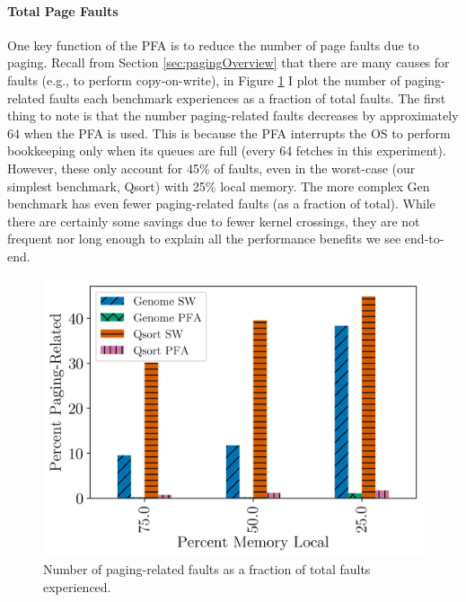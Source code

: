   \paragraph{Total Page Faults}
  One key function of the PFA is to reduce the number of page faults due to
  paging. Recall from Section \ref{sec:pagingOverview} that there are many
  causes for faults (e.g., to perform copy-on-write), in Figure
  \ref{fig:pfa_swapfault} I plot the number of paging-related faults each
  benchmark experiences as a fraction of total faults. The first thing to note
  is that the number paging-related faults decreases by approximately 64 when
  the PFA is used. This is because the PFA interrupts the OS to perform
  bookkeeping only when its queues are full (every 64 fetches in this
  experiment). However, these only account for 45\% of faults, even in the
  worst-case (our simplest benchmark, Qsort) with 25\% local memory. The more
  complex Gen benchmark has even fewer paging-related faults (as a fraction of
  total). While there are certainly some savings due to fewer kernel crossings,
  they are not frequent nor long enough to explain all the performance benefits
  we see end-to-end.

  \begin{figure}[h] \centering
    \includegraphics[width=0.9\columnwidth]{figs/swapfault.png}
    \caption{Number of paging-related faults as a fraction of total faults
    experienced.}
    \label{fig:pfa_swapfault}
  \end{figure}

